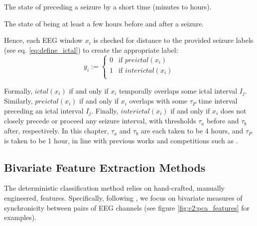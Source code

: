 \begin{definition}
The state of preceding a seizure by a short time (minutes to hours).
\end{definition}

\begin{definition}
The state of being at least a few hours before and after a seizure.
\end{definition}

Hence, each EEG window $x_i$ is checked for distance to the provided seizure labels (see eq. \ref{eq:define_ictal}) to create the appropriate label:
\begin{equation}
    y_i := 
      \begin{cases}
    0 & \text{if $preictal(x_i)$} \\
    1 & \text{if $interictal(x_i)$} \\
  \end{cases}
\end{equation}

Formally, $ictal(x_i)$ if and only if $x_i$ temporally overlaps some ictal interval $I_j$. Similarly, $preictal(x_i)$ if and only if $x_i$ overlaps with some $\tau_P$ time interval preceding an ictal interval $I_j$. Finally, $interictal(x_i)$ if and only if $x_i$ does not closely precede or proceed any seizure interval, with thresholds $\tau_{a}$ before and $\tau_{b}$ after, respectively. In this chapter, $\tau_{a}$ and $\tau_{b}$ are each taken to be 4 hours, and $\tau_P$ is taken to be 1 hour, in line with previous works and competitions such as \citet{mirowski2009classification, kaggle2014contests}.


\subsection{Bivariate Feature Extraction Methods}
\label{sec:c2:features}
The deterministic classification method relies on hand-crafted, manually engineered, features. Specifically, following \cite{mirowski2009classification}, we focus on bivariate measures of synchronicity between pairs of EEG channels (see figure \ref{fig:c2:pca_features} for examples).



